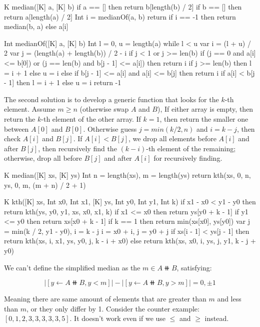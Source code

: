 \documentclass[b5paper]{article}
\begin{document}
\begin{Answer}
{\begin{Bourbaki}
K median([K] a, [K] b) {
    if a == [] then return b[length(b) / 2]
    if b == [] then return a[length(a) / 2]
    Int i = medianOf(a, b)
    return if i == -1 then return median(b, a) else a[i]
}

Int medianOf([K] a, [K] b) {
    Int l = 0, u = length(a)
    while l < u {
        var i = (l + u) / 2
        var j = (length(a) + length(b)) / 2  - i
        if j < 1 or j >= len(b) {
            if (j == 0 and a[i] <= b[0]) or
               (j == len(b) and b[j - 1] <= a[i]) then return i
            if j >= len(b) then l = i + 1 else u = i
        } else {
            if b[j - 1]  <= a[i] and a[i] <= b[j] then return i
            if a[i] < b[j - 1] then l = i + 1 else u = i
        }
    }
    return -1
}
\end{Bourbaki}

The second solution is to develop a generic function that looks for the $k$-th element. Assume $m \geq n$ (otherwise swap $A$ and $B$), If either array is empty, then return the $k$-th element of the other array. If $k = 1$, then return the smaller one between $A[0]$ and $B[0]$. Otherwise guess $j = min(k/2, n)$ and $i = k - j$, then check $A[i]$ and $B[j]$. If $A[i] < B[j]$, we drop all elements before $A[i]$ and after $B[j]$, then recursively find the $(k - i)$-th element of the remaining; otherwise, drop all before $B[j]$ and after $A[i]$ for recursively finding.

\begin{Bourbaki}
K median([K] xs, [K] ys) {
    Int n = length(xs), m = length(ys)
    return kth(xs, 0, n, ys, 0, m, (m + n) / 2 + 1)
}

K kth([K] xs, Int x0, Int x1, [K] ys, Int y0, Int y1, Int k) {
    if x1 - x0 < y1 - y0 then return kth(ys, y0, y1, xs, x0, x1, k)
    if x1 <= x0 then return ys[y0 + k - 1]
    if y1 <= y0 then return xs[x0 + k - 1]
    if k == 1 then return min(xs[x0], ys[y0])
    var j = min(k / 2, y1 - y0), i = k - j
    i = x0 + i, j = y0 + j
    if xs[i - 1] < ys[j - 1] then
        return kth(xs, i, x1, ys, y0, j, k - i + x0)
    else
        return kth(xs, x0, i, ys, j, y1, k - j + y0)
}
\end{Bourbaki}

We can't define the simplified median as the $m \in A \doubleplus B$, satisfying:

\[
|[y \gets A \doubleplus B, y < m]| - |[y \gets A \doubleplus B, y > m]| = 0, \pm 1
\]

Meaning there are same amount of elements that are greater than $m$ and less than $m$, or they only differ by 1. Consider the counter example: $[0, 1, 2, 3, 3, 3, 3, 3, 5]$. It doesn't work even if we use $\leq$ and $\geq$ instead.
}


\end{Answer}
\end{document}
